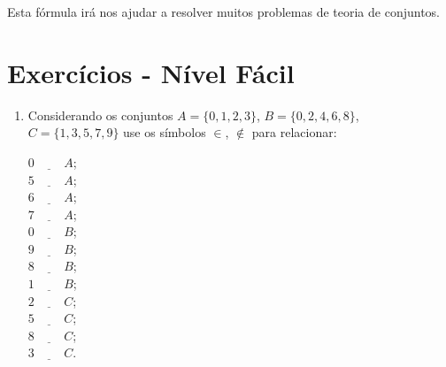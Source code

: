  Esta fórmula irá nos ajudar a resolver muitos problemas de teoria de conjuntos.

\newpage

\section{Exercícios - Nível Fácil}
\begin{enumerate}
 \item Considerando os conjuntos $A= \{0,1,2,3\}$,  $B=\{0,2,4,6,8\}$, $C= \{1,3,5,7,9\}$ use os símbolos $\in$, $\notin$ para relacionar:
 \begin{multicols}{4}
  $0 \underline{\hspace{1cm}} A$; \\ $5 \underline{\hspace{1cm}} A$; \\ $6 \underline{\hspace{1cm}} A$; \\ $7 \underline{\hspace{1cm}} A$;\\
  $0 \underline{\hspace{1cm}} B$; \\ $9 \underline{\hspace{1cm}} B$; \\ $8 \underline{\hspace{1cm}} B$; \\ $1 \underline{\hspace{1cm}} B$;\\
  $2 \underline{\hspace{1cm}} C$; \\ $5 \underline{\hspace{1cm}} C$; \\ $8 \underline{\hspace{1cm}} C$; \\ $3 \underline{\hspace{1cm}} C$.
 \end{multicols}

 
 

\end{enumerate}
